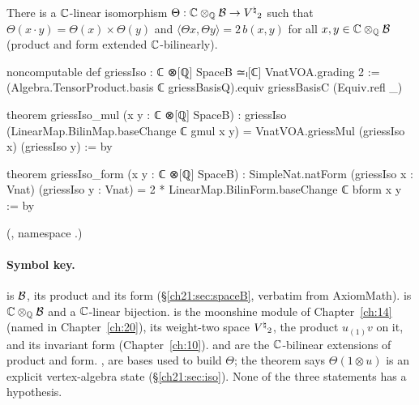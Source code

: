 \begin{theorem}\label{ch21:thm:intro}
There is a ${\mathbb{C}}$-linear isomorphism $\Theta:{\mathbb{C}}\otimes_{\mathbb{Q}}\mathcal{B}\to{V^{\natural}}_2$ such that
$\Theta(x\cdot y)=\Theta(x)\times\Theta(y)$ and $\langle\Theta x,\Theta y\rangle=2\,b(x,y)$ for all
$x,y\in{\mathbb{C}}\otimes_{\mathbb{Q}}\mathcal{B}$ (product and form extended ${\mathbb{C}}$-bilinearly).
\end{theorem}
\begin{leancode}
noncomputable def griessIso : ℂ ⊗[ℚ] SpaceB ≃ₗ[ℂ] VnatVOA.grading 2 :=
  (Algebra.TensorProduct.basis ℂ griessBasisQ).equiv griessBasisC (Equiv.refl _)
\end{leancode}
\begin{leancode}
theorem griessIso_mul (x y : ℂ ⊗[ℚ] SpaceB) :
    griessIso (LinearMap.BilinMap.baseChange ℂ gmul x y)
      = VnatVOA.griessMul (griessIso x) (griessIso y) := by
\end{leancode}
\begin{leancode}
theorem griessIso_form (x y : ℂ ⊗[ℚ] SpaceB) :
    SimpleNat.natForm (griessIso x : Vnat) (griessIso y : Vnat)
      = 2 * LinearMap.BilinForm.baseChange ℂ bform x y := by
\end{leancode}
(, namespace
.)

\paragraph{Symbol key.}   is $\mathcal{B}$,  its product and  its form
(\S\ref{ch21:sec:spaceB}, verbatim from AxiomMath).   is ${\mathbb{C}}\otimes_{\mathbb{Q}}\mathcal{B}$ and
 a ${\mathbb{C}}$-linear bijection.   is the moonshine module of Chapter~\ref{ch:14}
(named in Chapter~\ref{ch:20}),  its weight-two space ${V^{\natural}}_2$,
 the product $u_{(1)}v$ on it, and  its invariant form
(Chapter~\ref{ch:10}).   and
 are the ${\mathbb{C}}$-bilinear extensions of product and form.
,  are bases used to build $\Theta$; the theorem
 says $\Theta(1\otimes u)$ is an explicit vertex-algebra state
(\S\ref{ch21:sec:iso}).  None of the three statements has a hypothesis.

